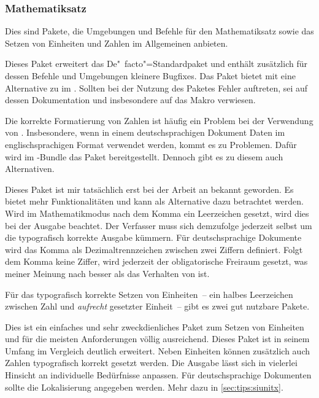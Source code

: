 \subsubsection{%
  Mathematiksatz%
}

Dies sind Pakete, die Umgebungen und Befehle für den Mathematiksatz sowie das 
Setzen von Einheiten und Zahlen im Allgemeinen anbieten.

\begin{DeclarePackages}
  Dieses Paket erweitert das De"~facto"=Standardpaket  und 
  enthält zusätzlich für dessen Befehle und Umgebungen kleinere Bugfixes.
  Das Paket bietet mit  eine Alternative zu  im 
  . Sollten bei 
  der Nutzung des Paketes Fehler auftreten, sei auf dessen Dokumentation und 
  insbesondere auf das Makro  verwiesen.
\end{DeclarePackages}

Die korrekte Formatierung von Zahlen ist häufig ein Problem bei der Verwendung 
von . Insbesondere, wenn in einem deutschsprachigen Dokument 
Daten im englischsprachigen Format verwendet werden, kommt es zu Problemen. 
Dafür wird im \TUDScript-Bundle das Paket  bereitgestellt. 
Dennoch gibt es zu diesem auch Alternativen.

\begin{DeclarePackages}[Zifferngruppierung]
  Dieses Paket ist mir tatsächlich erst bei der Arbeit an  
  bekannt geworden. Es bietet mehr Funktionalitäten und kann als Alternative 
  dazu betrachtet werden.
  Wird im Mathematikmodus nach dem Komma ein Leerzeichen gesetzt, wird dies 
  bei der Ausgabe beachtet. Der Verfasser muss sich demzufolge jederzeit 
  selbst um die typografisch korrekte Ausgabe kümmern.
  Für deutschsprachige Dokumente wird das Komma als Dezimaltrennzeichen 
  zwischen zwei Ziffern definiert. Folgt dem Komma keine Ziffer, wird 
  jederzeit der obligatorische Freiraum gesetzt, was meiner Meinung nach 
  besser als das Verhalten von  ist.
\end{DeclarePackages}

Für das typografisch korrekte Setzen von Einheiten~-- ein halbes Leerzeichen 
zwischen Zahl und \emph{aufrecht} gesetzter Einheit~-- gibt es zwei gut 
nutzbare Pakete.

\begin{DeclarePackages}[Einheiten]
  Dies ist ein einfaches und sehr zweckdienliches Paket zum Setzen von 
  Einheiten und für die meisten Anforderungen völlig ausreichend.
  Dieses Paket ist in seinem Umfang im Vergleich deutlich erweitert. Neben 
  Einheiten können zusätzlich auch Zahlen typografisch korrekt gesetzt werden. 
  Die Ausgabe lässt sich in vielerlei Hinsicht an individuelle Bedürfnisse 
  anpassen. Für deutschsprachige Dokumenten sollte die Lokalisierung angegeben 
  werden. Mehr dazu in \autoref{sec:tips:siunitx}.
\end{DeclarePackages}

